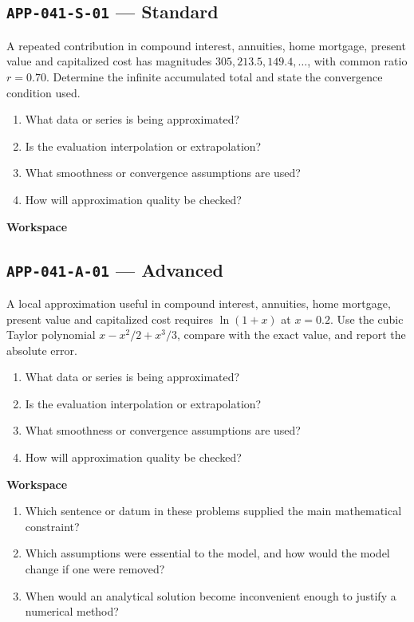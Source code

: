 \documentclass[11pt]{book}
\newcommand{\pid}[1]{\texttt{#1}}
\newcommand{\workspace}{\par\vspace{0.7in}\hrulefill\par\vspace{0.55in}\hrulefill\par}
\begin{document}
\subsection*{\pid{APP-041-S-01} — Standard}
\begin{problembox}
A repeated contribution in compound interest, annuities, home mortgage, present value and capitalized cost has magnitudes $305, 213.5, 149.4,\ldots$, with common ratio $r=0.70$. Determine the infinite accumulated total and state the convergence condition used.
\end{problembox}
\begin{promptbox}\begin{enumerate}
\item What data or series is being approximated?
\item Is the evaluation interpolation or extrapolation?
\item What smoothness or convergence assumptions are used?
\item How will approximation quality be checked?
\end{enumerate}\end{promptbox}
\textbf{Workspace}\workspace
{}
\subsection*{\pid{APP-041-A-01} — Advanced}
\begin{problembox}
A local approximation useful in compound interest, annuities, home mortgage, present value and capitalized cost requires $\ln(1+x)$ at $x=0.2$. Use the cubic Taylor polynomial $x-x^2/2+x^3/3$, compare with the exact value, and report the absolute error.
\end{problembox}
\begin{promptbox}\begin{enumerate}
\item What data or series is being approximated?
\item Is the evaluation interpolation or extrapolation?
\item What smoothness or convergence assumptions are used?
\item How will approximation quality be checked?
\end{enumerate}\end{promptbox}
\textbf{Workspace}\workspace
\begin{reflectionbox}\begin{enumerate}
\item Which sentence or datum in these problems supplied the main mathematical constraint?
\item Which assumptions were essential to the model, and how would the model change if one were removed?
\item When would an analytical solution become inconvenient enough to justify a numerical method?
\end{enumerate}\end{reflectionbox}
\end{document}

